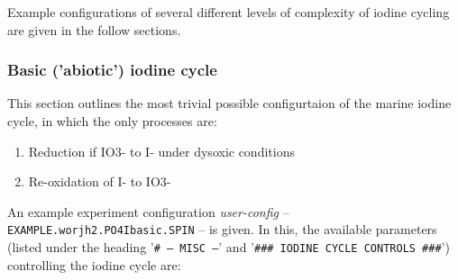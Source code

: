 \documentclass[11pt,fleqn]{book} %
\begin{document}
Example configurations of several different levels of complexity of iodine cycling are given in the follow sections.

%
\subsubsection{Basic ('abiotic') iodine cycle}
\vspace{1mm}

This section outlines the most trivial possible configurtaion of the marine iodine cycle, in which the only processes are:
\begin{enumerate}[noitemsep]
\vspace{1mm}
\item Reduction if IO3- to I- under dysoxic conditions
\vspace{1mm}
\item Re-oxidation of I- to IO3-
\end{enumerate}
\vspace{1mm}

\noindent An example experiment configuration \textit{user-config} -- \texttt{EXAMPLE.worjh2.PO4Ibasic.SPIN} -- is given. In this, the available parameters (listed under the heading '\texttt{\# --- MISC ---}' and '\texttt{\#\#\# IODINE CYCLE CONTROLS \#\#\#}') controlling the iodine cycle are:
\end{document}
